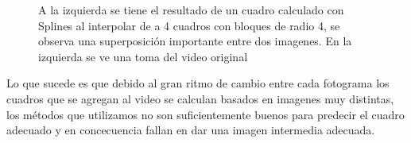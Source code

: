 \begin{figure}[H]
\centering
\begin{minipage}{0.48\textwidth}
\end{minipage}%
\hfill
\begin{minipage}{0.48\textwidth}   

\end{minipage}
\caption{\footnotesize A la izquierda se tiene el resultado de un cuadro calculado con Splines al interpolar de a 4 cuadros con bloques de radio 4, se observa una superposición importante entre dos imagenes. En la izquierda se ve una toma del video original}
\end{figure}

Lo que sucede es que debido al gran ritmo de cambio entre cada fotograma los cuadros que se agregan al video se calculan basados en imagenes muy distintas, los métodos que utilizamos no son suficientemente buenos para predecir el cuadro adecuado y en concecuencia fallan en dar una imagen intermedia adecuada.

